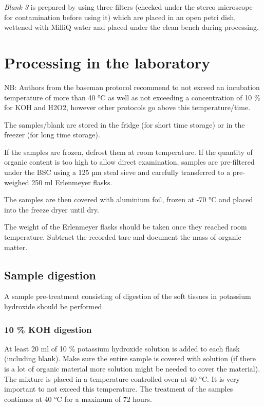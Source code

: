 \documentclass[
  icelandic,
]{book}
\begin{document}
\emph{Blank 3} is prepared by using three filters (checked under the stereo microscope for contamination before using it) which are placed in an open petri dish, wettened with MilliQ water and placed under the clean bench during processing.

\hypertarget{processing-in-the-laboratory}{%
\chapter{Processing in the laboratory}\label{processing-in-the-laboratory}}

NB: Authors from the baseman protocol recommend to not exceed an incubation temperature of more than 40 °C as well as not exceeding a concentration of 10 \% for KOH and H2O2, however other protocols go above this temperature/time.

The samples/blank are stored in the fridge (for short time storage) or in the freezer (for long time storage).

If the samples are frozen, defrost them at room temperature. If the quantity of organic content is too high to allow direct examination, samples are pre-filtered under the BSC using a 125 µm steal sieve and carefully transferred to a pre-weighed 250 ml Erlenmeyer flasks.

The samples are then covered with aluminium foil, frozen at -70 °C and placed into the freeze dryer until dry.

The weight of the Erlenmeyer flasks should be taken once they reached room temperature. Subtract the recorded tare and document the mass of organic matter.

\hypertarget{sample-digestion}{%
\section{Sample digestion}\label{sample-digestion}}

A sample pre-treatment consisting of digestion of the soft tissues in potassium hydroxide should be performed.

\hypertarget{koh-digestion}{%
\subsection{10 \% KOH digestion}\label{koh-digestion}}

At least 20 ml of 10 \% potassium hydroxide solution is added to each flask (including blank). Make sure the entire sample is covered with solution (if there is a lot of organic material more solution might be needed to cover the material). The mixture is placed in a temperature-controlled oven at 40 °C. It is very important to not exceed this temperature. The treatment of the samples continues at 40 °C for a maximum of 72 hours.
\end{document}
